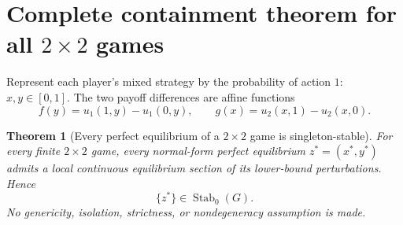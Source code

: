 \documentclass[11pt]{article}
\newcommand{\Stab}{\operatorname{Stab}_0}
\newtheorem{theorem}{Theorem}[section]
\theoremstyle{definition}
\theoremstyle{remark}
\begin{document}
\section{\texorpdfstring{Complete containment theorem for all $2\times2$ games}{Complete containment theorem for all 2 by 2 games}}
Represent each player's mixed strategy by the probability of action $1$:
$x,y\in[0,1]$. The two payoff differences are affine functions
\[
 f(y)=u_1(1,y)-u_1(0,y),\qquad
 g(x)=u_2(x,1)-u_2(x,0).
\]

\begin{theorem}[Every perfect equilibrium of a $2\times2$ game is singleton-stable]
\label{thm:2by2}
For every finite $2\times2$ game, every normal-form perfect equilibrium
$z^*=(x^*,y^*)$ admits a local continuous equilibrium section of its
lower-bound perturbations. Hence
\[
 \{z^*\}\in\Stab(G).
\]
No genericity, isolation, strictness, or nondegeneracy assumption is made.
\end{theorem}
\end{document}

